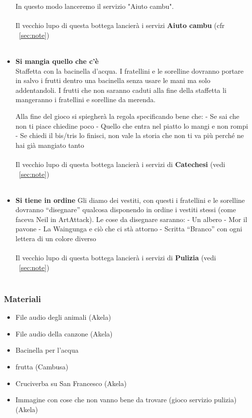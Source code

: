 \documentclass[../main.tex]{subfiles}
\begin{document}
\begin{itemize}
           In questo modo lanceremo il servizio "Aiuto cambu".\\
            \\
            Il vecchio lupo di questa bottega lancierà i servizi \textbf{Aiuto cambu} (cfr ~\ref{sec:note})\\
            \\
        \item
        \textbf{Si mangia quello che c'è}\\
Staffetta con la bacinella d'acqua. I fratellini e le sorelline dovranno portare in salvo i frutti dentro una bacinella senza usare le mani ma solo addentandoli. I frutti che non saranno caduti alla fine della staffetta li mangeranno i fratellini e sorelline da merenda.

Alla fine del gioco si spiegherà la regola specificando bene che:
- Se sai che non ti piace chiedine poco
- Quello che entra nel piatto lo mangi e non rompi
- Se chiedi il bis/tris lo finisci, non vale la storia che non ti va più perché ne hai già mangiato tanto\\
            \\
            Il vecchio lupo di questa bottega lancierà i servizi di \textbf{Catechesi} (vedi ~\ref{sec:note})\\
            \\
        \item
         \textbf{Si tiene in ordine}
Gli diamo dei vestiti, con questi i fratellini e le sorelline dovranno “disegnare” qualcosa disponendo in ordine i vestiti stessi (come faceva Neil in ArtAttack).
Le cose da disegnare saranno:
- Un albero
- Mor il pavone
- La Waingunga e ciò che ci stà attorno
- Scritta “Branco” con ogni lettera di un colore diverso\\
            \\
            Il vecchio lupo di questa bottega lancierà i servizi di \textbf{Pulizia} (vedi ~\ref{sec:note})\\
            \\
        \end{itemize}
        
        \subsubsection{Materiali}
            \begin{itemize}
                \item File audio degli animali  (Akela)
                \item File audio della canzone  (Akela)
                \item Bacinella per l'acqua
                \item frutta (Cambusa)
                \item Cruciverba su San Francesco (Akela)
                \item Immagine con cose che non vanno bene da trovare (gioco servizio pulizia)    (Akela)
            \end{itemize}
\end{document}
